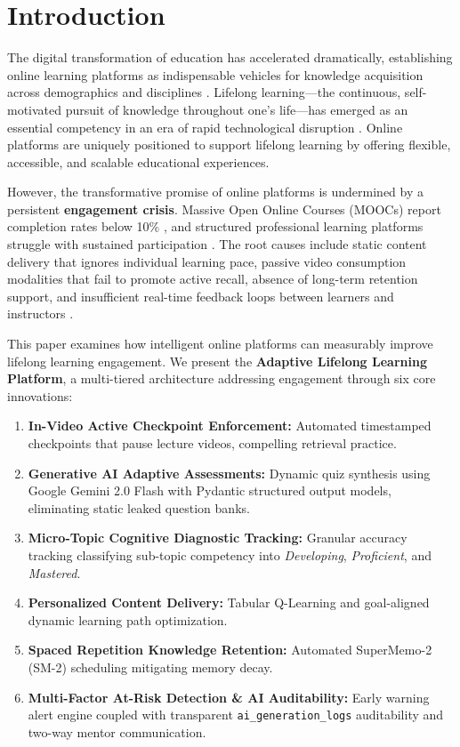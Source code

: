 \documentclass[conference]{IEEEtran}
\begin{document}
\section{Introduction}
The digital transformation of education has accelerated dramatically, establishing online learning platforms as indispensable vehicles for knowledge acquisition across demographics and disciplines \cite{shah2023}. Lifelong learning---the continuous, self-motivated pursuit of knowledge throughout one's life---has emerged as an essential competency in an era of rapid technological disruption \cite{jarvis2006}. Online platforms are uniquely positioned to support lifelong learning by offering flexible, accessible, and scalable educational experiences.

However, the transformative promise of online platforms is undermined by a persistent \textbf{engagement crisis}. Massive Open Online Courses (MOOCs) report completion rates below 10\% \cite{reich2019}, and structured professional learning platforms struggle with sustained participation \cite{kizilcec2013}. The root causes include static content delivery that ignores individual learning pace, passive video consumption modalities that fail to promote active recall, absence of long-term retention support, and insufficient real-time feedback loops between learners and instructors \cite{brusilovsky2007}.

This paper examines how intelligent online platforms can measurably improve lifelong learning engagement. We present the \textbf{Adaptive Lifelong Learning Platform}, a multi-tiered architecture addressing engagement through six core innovations:
\begin{enumerate}
    \item \textbf{In-Video Active Checkpoint Enforcement:} Automated timestamped checkpoints that pause lecture videos, compelling retrieval practice.
    \item \textbf{Generative AI Adaptive Assessments:} Dynamic quiz synthesis using Google Gemini 2.0 Flash with Pydantic structured output models, eliminating static leaked question banks.
    \item \textbf{Micro-Topic Cognitive Diagnostic Tracking:} Granular accuracy tracking classifying sub-topic competency into \textit{Developing}, \textit{Proficient}, and \textit{Mastered}.
    \item \textbf{Personalized Content Delivery:} Tabular Q-Learning and goal-aligned dynamic learning path optimization.
    \item \textbf{Spaced Repetition Knowledge Retention:} Automated SuperMemo-2 (SM-2) scheduling mitigating memory decay.
    \item \textbf{Multi-Factor At-Risk Detection \& AI Auditability:} Early warning alert engine coupled with transparent \texttt{ai\_generation\_logs} auditability and two-way mentor communication.
\end{enumerate}
\end{document}
